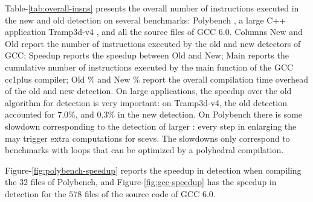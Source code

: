 \documentclass{sig-alternate}
\begin{document}
Table-\ref{tab:overall-insns} presents the overall number of instructions
executed in the new and old \SCoP{} detection on several benchmarks: Polybench
\cite{polybench}, a large C++ application Tramp3d-v4 \cite{richi}, and all the
source files of GCC 6.0.  Columns New and Old report the number of instructions
executed by the old and new \SCoP{} detectors of GCC; Speedup reports the speedup
between Old and New; Main reports the cumulative number of instructions executed
by the main function of the GCC cc1plus compiler; Old \% and New \% report the
overall compilation time overhead of the old and new \SCoP{} detection.  On large
applications, the speedup over the old algorithm for \SCoP{} detection is very
important: on Tramp3d-v4, the old \SCoP{} detection accounted for $7.0\%$, and
$0.3\%$ in the new \SCoP{} detection.  On Polybench there is some slowdown
corresponding to the detection of larger : every step in enlarging the \SCoP{}
may trigger extra computations for scevs.  The slowdowns only correspond to
benchmarks with loops that can be optimized by a polyhedral compilation.

Figure-\ref{fig:polybench-speedup} reports the speedup in \SCoP{} detection when
compiling the $32$ files of Polybench, and Figure-\ref{fig:gcc-speedup} has the
speedup in \SCoP{} detection for the $578$ files of the source code of GCC 6.0.

\begin{table}[h!]
  \begin{center}
  \end{center}
  \caption{Overall number of instructions spent in \SCoP{} detection.}
  \label{tab:overall-insns}
\end{table}
\end{document}
